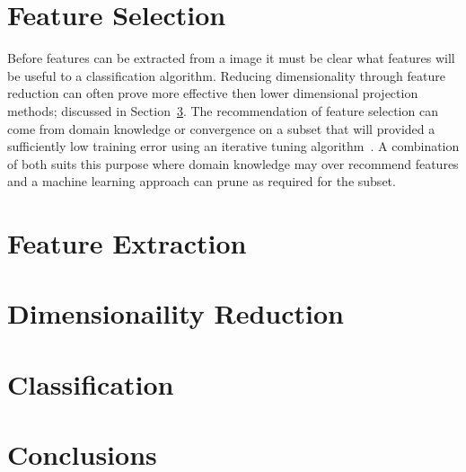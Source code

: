 \documentclass[journal]{IEEEtran}
\begin{document}
\section{Feature Selection}
\label{sec:selection}
Before features can be extracted from a image it must be clear what features will be useful to a classification algorithm.
Reducing dimensionality through feature reduction can often prove more effective then lower dimensional projection methods; discussed in Section~\ref{sec:reduce}.
The recommendation of feature selection can come from domain knowledge or convergence on a subset that will provided a sufficiently low training error using an iterative tuning algorithm~\cite{bu07feature,li10tumor}.
A combination of both suits this purpose where domain knowledge may over recommend features and a machine learning approach can prune as required for the subset.  










\section{Feature Extraction}
\label{sec:extraction}











\section{Dimensionaility Reduction}
\label{sec:reduce}











\section{Classification}
\label{sec:class}









\section{Conclusions}
\label{sec:conclusions}
\end{document}
